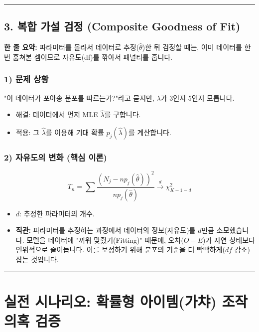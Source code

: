 \documentclass[11pt,a4paper]{book}
\theoremstyle{definition}
\begin{document}
\vspace{0.5cm}\hrule\vspace{0.5cm}

\subsection{3. 복합 가설 검정 (Composite Goodness of Fit)}

\begin{conceptbox}[title={개념 3: 옷을 몸에 맞췄다면, 심사 기준을 높여라}]
\textbf{한 줄 요약:} 파라미터를 몰라서 데이터로 추정($\hat{\theta}$)한 뒤 검정할 때는, 이미 데이터를 한 번 훔쳐본 셈이므로 자유도(df)를 깎아서 패널티를 줍니다.
\end{conceptbox}

\subsubsection*{1) 문제 상황}
"이 데이터가 포아송 분포를 따르는가?"라고 묻지만, $\lambda$가 3인지 5인지 모릅니다.
\begin{itemize}
    \item 해결: 데이터에서 먼저 MLE $\hat{\lambda}$를 구합니다.
    \item 적용: 그 $\hat{\lambda}$를 이용해 기대 확률 $p_j(\hat{\lambda})$를 계산합니다.
\end{itemize}

\subsubsection*{2) 자유도의 변화 (핵심 이론)}
$$ T_n = \sum \frac{(N_j - n p_j(\hat{\theta}))^2}{n p_j(\hat{\theta})} \xrightarrow{d} \chi^2_{K-1-d} $$
\begin{itemize}
    \item $d$: 추정한 파라미터의 개수.
    \item \textbf{직관:} 파라미터를 추정하는 과정에서 데이터의 정보(자유도)를 $d$만큼 소모했습니다. 모델을 데이터에 "끼워 맞췄기(Fitting)" 때문에, 오차($O-E$)가 자연 상태보다 인위적으로 줄어듭니다. 이를 보정하기 위해 분포의 기준을 더 빡빡하게($df$ 감소) 잡는 것입니다.
\end{itemize}

\vspace{0.5cm}\hrule\vspace{0.5cm}

\section{실전 시나리오: 확률형 아이템(가챠) 조작 의혹 검증}
\end{document}
